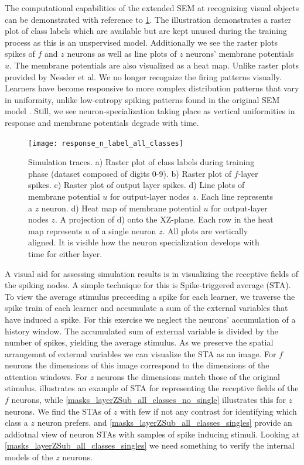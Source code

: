 \documentclass{report}
\begin{document}
The computational capabilities of the extended SEM at recognizing visual objects can be demonstrated with reference to \cref{fig:response_n_label_all_classes}. The illustration demonstrates a raster plot of class labels which are available but are kept unused during the training process as this is an unspervised model. Additionally we see the raster plots spikes of $f$ and $z$ neurons as well as line plots of $z$ neurons' membrane potentials $u$. The membrane potentials are also visualized as a heat map. Unlike raster plots provided by Nessler et al. We no longer recognize the firing patterns visually. Learners have become responsive to more complex distribution patterns that vary in uniformity, unlike low-entropy spiking patterns found in the original SEM model \cite{Nessler2010}. Still, we see neuron-specialization taking place as vertical uniformities in response and membrane potentials degrade with time.\\

\begin{figure}[ht]
\centering
\texttt{[image: response\_n\_label\_all\_classes]}
\caption{Simulation traces. a) Raster plot of class labels during training phase (dataset composed of digits 0-9). b) Raster plot of $f$-layer spikes. c) Raster plot of output layer spikes. d) Line plots of membrane potential $u$ for output-layer nodes $z$. Each line represents a $z$ neuron. d) Heat map of membrane potential $u$ for output-layer nodes $z$. A projection of d) onto the XZ-plane. Each row in the heat map represents $u$ of a single neuron $z$. All plots are vertically aligned. It is visible how the neuron specialization develops with time for either layer.
\label{fig:response_n_label_all_classes}}
\end{figure}

A visual aid for assessing simulation results is in visualizing the receptive fields of the spiking nodes. A simple technique for this is Spike-triggered average (STA). To view the average stimulus preceeding a spike for each learner, we traverse the spike train of each learner and accumulate a sum of the external variables that have induced a spike. For this exercise we neglect the neurons' accumulation of a history window. The accumulated sum of external variable is divided by the number of spikes, yielding the average stimulus. As we preserve the spatial arrangemnt of external variables we can visualize the STA as an image. For $f$ neurons the dimensions of this image correspond to the dimensions of the attention windows. For $z$ neurons the dimensions match those of the original stimulus.  illustrates an example of STA for representing the receptive fields of the $f$ neurons, while \cref{masks_layerZSub_all_classes_no_single} illustrates this for $z$ neurons. We find the STAs of $z$ with few if not any contrast for identifying which class a $z$ neuron prefers.  and \cref{masks_layerZSub_all_classes_singles} provide an addiotnal view of neuron STAs with samples of spike inducing stimuli. Looking at \cref{masks_layerZSub_all_classes_singles} we need something to verify the internal models of the $z$ neurons.
\end{document}
